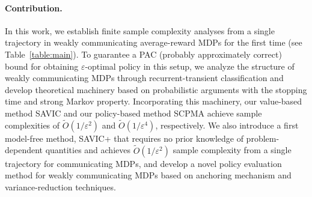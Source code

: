 \documentclass{article}
\theoremstyle{definition}
\theoremstyle{remark}
\begin{document}
\paragraph{Contribution.}
In this work, we establish finite sample complexity analyses from a single trajectory in weakly communicating average-reward MDPs for the first time (see Table~\ref{table:main}). To guarantee a PAC (probably approximately correct) bound for obtaining $\varepsilon$-optimal policy in this setup, we analyze the structure of weakly communicating MDPs through recurrent-transient classification and develop theoretical machinery based on probabilistic arguments with the stopping time and strong Markov property. Incorporating this machinery, our value-based method SAVIC and our policy-based method SCPMA achieve sample complexities of $\widetilde{O}(1/\varepsilon^2)$ and $\widetilde{O}(1/\varepsilon^4)$, respectively. We also introduce a first model-free method, SAVIC+ that requires no prior knowledge of problem-dependent quantities and achieves $\widetilde{O}(1/\varepsilon^2)$ sample complexity from a single trajectory for communicating MDPs, and develop a novel policy evaluation method for weakly communicating MDPs based on anchoring mechanism and variance-reduction techniques.
\end{document}
